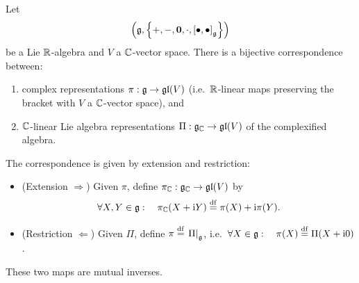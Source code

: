 \documentclass[11pt,reqno]{amsart}
\newcommand{\ii}{\mathrm{i}}
\begin{document}
\begin{Prop}\label{prop:complex-rep-equivalence}
Let
\[\Br{\g,\set{+,-,\bm0,\cdot,\SqBr{\bullet,\bullet}_\g}}\]
be a Lie $\mathbb{R}$-algebra
and $V$ a $\mathbb{C}$-vector space.
There is a bijective correspondence between:
\begin{enumerate}
\item complex representations $\pi:\mathfrak{g}\to\mathfrak{gl}(V)$ (i.e.\ $\mathbb{R}$-linear maps
preserving the bracket with $V$ a $\mathbb{C}$-vector space), and
\item $\mathbb{C}$-linear Lie algebra representations $\Pi:\mathfrak{g}_{\mathbb{C}}\to\mathfrak{gl}(V)$
of the complexified algebra.
\end{enumerate}
The correspondence is given by extension and restriction:
\begin{itemize}
\item (Extension $\Rightarrow$) Given $\pi$, define
$\pi_{\mathbb{C}}:\mathfrak{g}_{\mathbb{C}}\to\mathfrak{gl}(V)$ by
\[
\forall X,Y\in\g:\quad
\pi_\C(X+\ii Y)\df\pi(X)+\ii\pi(Y).
\]
\item (Restriction $\Leftarrow$) Given $\Pi$, define
$\pi\df\eval{\Pi}_{\g}$, i.e.\
$\forall X\in\g:\quad\pi(X)\df\Pi(X+\ii0)$.
\end{itemize}
These two maps are mutual inverses.
\end{Prop}
\end{document}
